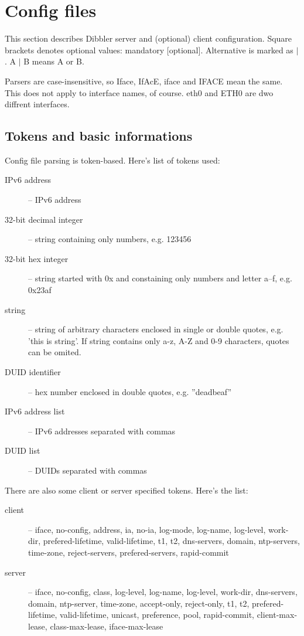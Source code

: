 

\section{Config files}

This section describes Dibbler server and (optional) client
configuration. Square brackets denotes optional values: mandatory
[optional]. Alternative is marked as $\mid$. A $\mid$ B means A or B.

Parsers are case-insensitive, so Iface, IfAcE, iface and IFACE mean the
same. This does not apply to interface names, of course. eth0 and ETH0
are dwo diffrent interfaces.

\subsection{Tokens and basic informations}
Config file parsing is token-based. Here's list of tokens used:
\begin{description}
\item[IPv6 address] -- IPv6 address 
\item[32-bit decimal integer] -- string containing only numbers, e.g. 123456
\item[32-bit hex integer] -- string started with 0x and constaining only numbers and
  letter a--f, e.g. 0x23af
\item[string] -- string of arbitrary characters enclosed in single or double
  quotes, e.g. 'this is string'. If string contains only a-z, A-Z and
  0-9 characters, quotes can be omited.
\item[DUID identifier] -- hex number enclosed in double quotes,
  e.g. ''deadbeaf''
\item[IPv6 address list] -- IPv6 addresses separated with commas
\item[DUID list] -- DUIDs separated with commas
\end{description}

There are also some client or server specified tokens. Here's the list:
\begin{description}
\item[client] -- iface, no-config, address, ia, no-ia,
log-mode, log-name, log-level, work-dir, prefered-lifetime, valid-lifetime,
t1, t2, dns-servers, domain, ntp-servers, time-zone, reject-servers,
prefered-servers, rapid-commit 
\item[server] -- iface, no-config, class, log-level, log-name,
  log-level, work-dir, dns-servers, domain, ntp-server, time-zone, accept-only,
  reject-only, t1, t2, prefered-lifetime, valid-lifetime, unicast,
  preference, pool, rapid-commit, client-max-lease, class-max-lease,
  iface-max-lease
\end{description}

